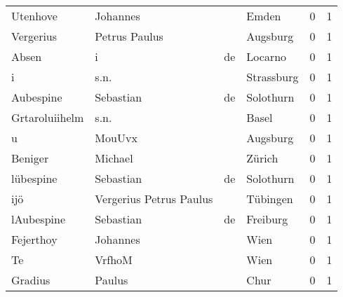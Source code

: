 \begin{center}
\begin{tiny}
\begin{longtabu}{llllrr}
                 Utenhove &                           Johannes &             &                                       Emden &          0 &         1 \\
                Vergerius &                      Petrus Paulus &             &                                    Augsburg &          0 &         1 \\
                    Absen &                                  i &          de &                                     Locarno &          0 &         1 \\
                        i &                               s.n. &             &                                  Strassburg &          0 &         1 \\
                Aubespine &                          Sebastian &          de &                                   Solothurn &          0 &         1 \\
           Grtaroluiihelm &                               s.n. &             &                                       Basel &          0 &         1 \\
                        u &                             MouUvx &             &                                    Augsburg &          0 &         1 \\
                  Beniger &                            Michael &             &                                      Zürich &          0 &         1 \\
                lübespine &                          Sebastian &          de &                                   Solothurn &          0 &         1 \\
                      ijö &            Vergerius Petrus Paulus &             &                                    Tübingen &          0 &         1 \\
               lAubespine &                          Sebastian &          de &                                    Freiburg &          0 &         1 \\
                Fejerthoy &                           Johannes &             &                                        Wien &          0 &         1 \\
                       Te &                             VrfhoM &             &                                        Wien &          0 &         1 \\
                  Gradius &                             Paulus &             &                                        Chur &          0 &         1 \\

\end{longtabu}
\end{tiny}
\end{center}
